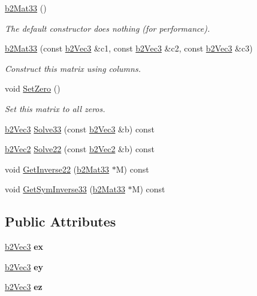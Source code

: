 \begin{DoxyCompactItemize}
\mbox{\label{structb2Mat33_a1f4d7ddf1c8a202fc08ec64dfe191463}} 
\hyperlink{structb2Mat33_a1f4d7ddf1c8a202fc08ec64dfe191463}{b2\+Mat33} ()
\begin{DoxyCompactList}\small\item\em The default constructor does nothing (for performance). \end{DoxyCompactList}\item 
\mbox{\label{structb2Mat33_a36d99a037008776c8d09fe0aeb5c759c}} 
\hyperlink{structb2Mat33_a36d99a037008776c8d09fe0aeb5c759c}{b2\+Mat33} (const \hyperlink{structb2Vec3}{b2\+Vec3} \&c1, const \hyperlink{structb2Vec3}{b2\+Vec3} \&c2, const \hyperlink{structb2Vec3}{b2\+Vec3} \&c3)
\begin{DoxyCompactList}\small\item\em Construct this matrix using columns. \end{DoxyCompactList}\item 
\mbox{\label{structb2Mat33_a42fc6953b025e1c8b59717d0ee7accde}} 
void \hyperlink{structb2Mat33_a42fc6953b025e1c8b59717d0ee7accde}{Set\+Zero} ()
\begin{DoxyCompactList}\small\item\em Set this matrix to all zeros. \end{DoxyCompactList}\item 
\hyperlink{structb2Vec3}{b2\+Vec3} \hyperlink{structb2Mat33_a2ce48f409ba5951a04da821dada9e285}{Solve33} (const \hyperlink{structb2Vec3}{b2\+Vec3} \&b) const
\item 
\hyperlink{structb2Vec2}{b2\+Vec2} \hyperlink{structb2Mat33_acdf892aab7e26283f8aa600ade91dcef}{Solve22} (const \hyperlink{structb2Vec2}{b2\+Vec2} \&b) const
\item 
void \hyperlink{structb2Mat33_aa020bfd08e28c4cecda303ba335fe517}{Get\+Inverse22} (\hyperlink{structb2Mat33}{b2\+Mat33} $\ast$M) const
\item 
void \hyperlink{structb2Mat33_a2620944663233096d3b82bc4b1a991e9}{Get\+Sym\+Inverse33} (\hyperlink{structb2Mat33}{b2\+Mat33} $\ast$M) const
\end{DoxyCompactItemize}
\subsection*{Public Attributes}
\begin{DoxyCompactItemize}
\item 
\mbox{\label{structb2Mat33_a132f00e6550d1e19c75fb60ce1229638}} 
\hyperlink{structb2Vec3}{b2\+Vec3} {\bfseries ex}
\item 
\mbox{\label{structb2Mat33_ababc69c718c73a04a651f7a6a981ecf4}} 
\hyperlink{structb2Vec3}{b2\+Vec3} {\bfseries ey}
\item 
\mbox{\label{structb2Mat33_ae700fc46f679b4ef211a2517005b0557}} 
\hyperlink{structb2Vec3}{b2\+Vec3} {\bfseries ez}
\end{DoxyCompactItemize}


